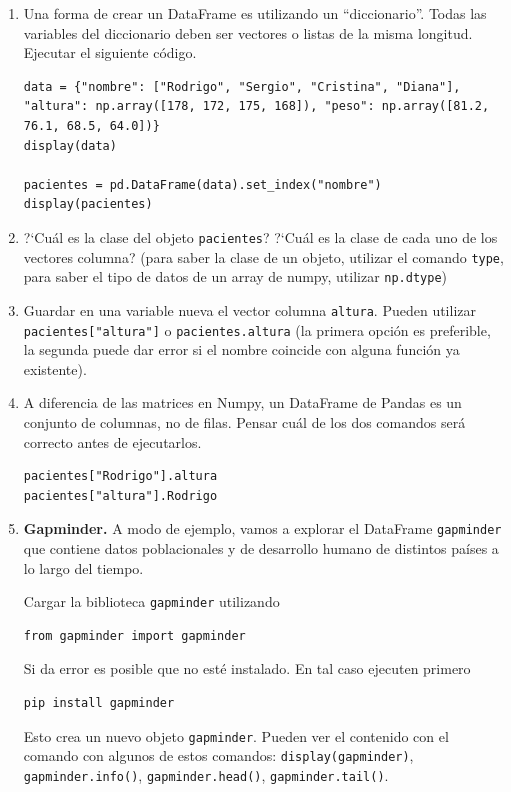 \documentclass[a4paper,11pt]{article}
\theoremstyle{definition}
\begin{document}
\begin{enumerate}[resume]
\item Una forma de crear un DataFrame es utilizando un ``diccionario''. Todas las variables del diccionario deben ser vectores o listas de la misma longitud. Ejecutar el siguiente c\'odigo.

\begin{lstlisting}
data = {"nombre": ["Rodrigo", "Sergio", "Cristina", "Diana"], "altura": np.array([178, 172, 175, 168]), "peso": np.array([81.2, 76.1, 68.5, 64.0])}
display(data)

pacientes = pd.DataFrame(data).set_index("nombre")
display(pacientes)
\end{lstlisting}

\item ?`Cu\'al es la clase del objeto \lstinline{pacientes}? ?`Cu\'al es la clase de cada uno de los vectores columna? (para saber la clase de un objeto, utilizar el comando \lstinline{type}, para saber el tipo de datos de un array de numpy, utilizar \lstinline{np.dtype})

\item Guardar en una variable nueva el vector columna \lstinline{altura}. Pueden utilizar \lstinline{pacientes["altura"]} o \lstinline{pacientes.altura} (la primera opci\'on es preferible, la segunda puede dar error si el nombre coincide con alguna funci\'on ya existente).

\item A diferencia de las matrices en Numpy, un DataFrame de Pandas es un conjunto de columnas, no de filas. Pensar cu\'al de los dos comandos ser\'a correcto antes de ejecutarlos.
\begin{lstlisting}
pacientes["Rodrigo"].altura
pacientes["altura"].Rodrigo
\end{lstlisting}


\item \textbf{Gapminder.} A modo de ejemplo, vamos a explorar el DataFrame \lstinline{gapminder} que contiene datos poblacionales y de desarrollo humano de distintos pa\'ises a lo largo del tiempo.

    Cargar la biblioteca \lstinline{gapminder} utilizando
\begin{lstlisting}
from gapminder import gapminder
\end{lstlisting}
Si da error es posible que no est\'e instalado. En tal caso ejecuten primero
\begin{lstlisting}
pip install gapminder
\end{lstlisting}
Esto crea un nuevo objeto \lstinline{gapminder}. Pueden ver el contenido con el comando con algunos de estos comandos: \lstinline{display(gapminder)}, \lstinline{gapminder.info()}, \lstinline{gapminder.head()}, \lstinline{gapminder.tail()}.


\end{enumerate}
\end{document}
